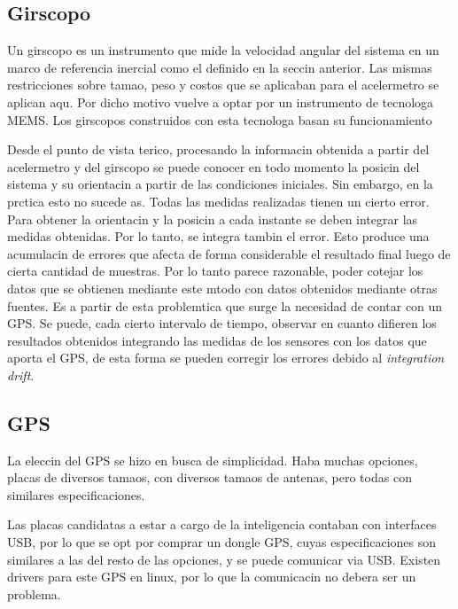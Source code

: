 \documentclass[spanish,12pt,a4paper,titlepage]{report}
\begin{document}
\subsection{Girscopo}
\label{giro}
\vspace*{15pt}

Un girscopo es un instrumento que mide la velocidad angular del sistema en un marco de referencia inercial como el definido en la seccin anterior. Las mismas restricciones sobre tamao, peso y costos que se aplicaban para el acelermetro se aplican aqu. Por dicho motivo vuelve a optar por un instrumento de tecnologa MEMS. Los girscopos construidos con esta tecnologa basan su funcionamiento 

Desde el punto de vista terico, procesando la informacin obtenida a partir del acelermetro y del girscopo se puede conocer en todo momento la posicin del sistema y su orientacin a partir de las condiciones iniciales.
Sin embargo, en la prctica esto no sucede as. Todas las medidas realizadas tienen un cierto error. Para obtener la orientacin y la posicin a cada instante se deben integrar las medidas obtenidas. Por lo tanto, se integra tambin el error. Esto produce una acumulacin de errores que afecta de forma considerable el resultado final luego de cierta cantidad de muestras. Por lo tanto parece razonable, poder cotejar los datos que se obtienen mediante este mtodo con datos obtenidos mediante otras fuentes. Es a partir de esta problemtica que surge la necesidad de contar con un GPS. Se puede, cada cierto intervalo de tiempo, observar en cuanto difieren los resultados obtenidos integrando las medidas de los sensores con los datos que aporta el GPS, de esta forma se pueden corregir los errores debido al \emph{integration drift}.

\subsection{GPS}
\vspace*{15pt}

La eleccin del GPS se hizo en busca de simplicidad. Haba muchas opciones, placas de diversos tamaos, con diversos tamaos de antenas, pero todas con similares especificaciones.

Las placas candidatas a estar a cargo de la inteligencia contaban con interfaces USB, por lo que se opt por comprar un dongle GPS, cuyas especificaciones son similares a las del resto de las opciones, y se puede comunicar via USB. Existen drivers para este GPS en linux, por lo que la comunicacin no debera ser un problema.
\end{document}
